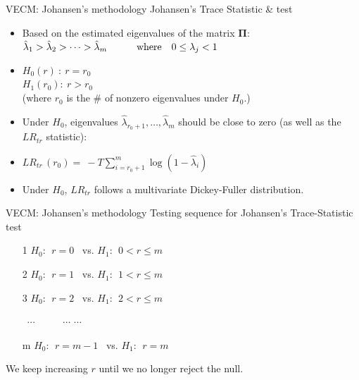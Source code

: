 \documentclass[usenames,dvipsnames]{beamer}
\begin{document}
\begin{frame}{VECM: Johansen’s methodology}
Johansen's Trace Statistic \& test\\
\bigskip
\begin{itemize}
    \item Based on the estimated eigenvalues of the matrix $\bm{\Pi}$:\\
    $\hat{\lambda}_1 > \hat{\lambda}_2 > \dots > \hat{\lambda}_m \qquad \textnormal{~~~where~~~}0 \leq \lambda_j < 1$\\
    
    \medskip
    \item $H_0(r)~:~r=r_0$ \\$H_1(r_0):~r > r_0$ \\ (where $r_0$ is the \# of nonzero eigenvalues under $H_0$.)
    \medskip
    \item Under $H_0$, eigenvalues $\hat{\lambda}_{r_0+1}, \dots, \hat{\lambda}_{m}$ should be close to zero (as well as the $\textit{LR}_{\textit{tr}}$ statistic): \\
    \medskip
    \item $\textit{LR}_{\textit{tr}}\, (r_0) =~ - T \! \displaystyle \sum_{i=r_0+1}^m \log(1-\hat{\lambda}_i) $\\
    \medskip
    \item Under $H_0$, $\textit{LR}_{\textit{tr}}$ follows a multivariate Dickey-Fuller distribution.
\end{itemize}
\end{frame}
\begin{frame}{VECM: Johansen’s methodology}
Testing sequence for Johansen's Trace-Statistic test\\
\bigskip
\begin{enumerate}
    \item[1] $H_0:~~r=0$ \qquad \qquad ~vs. \qquad $H_1:~~0 < r \leq m$
    \item[2] $H_0:~~r=1$ \qquad \qquad  ~vs. \qquad $H_1:~~1 < r \leq m$
    \item[3] $H_0:~~r=2$ \qquad  \qquad ~vs. \qquad $H_1:~~2 < r \leq m$
    \item[] ~$\cdots$ \qquad \qquad \qquad ~~~~~$\cdots$ \qquad \qquad $\cdots$
    \item[m] $H_0:~~r=m-1$ \qquad ~vs. \qquad $H_1:~~r = m$
\end{enumerate}
\bigskip
We keep increasing $r$ until we no longer reject the null.
\end{frame}
\end{document}
